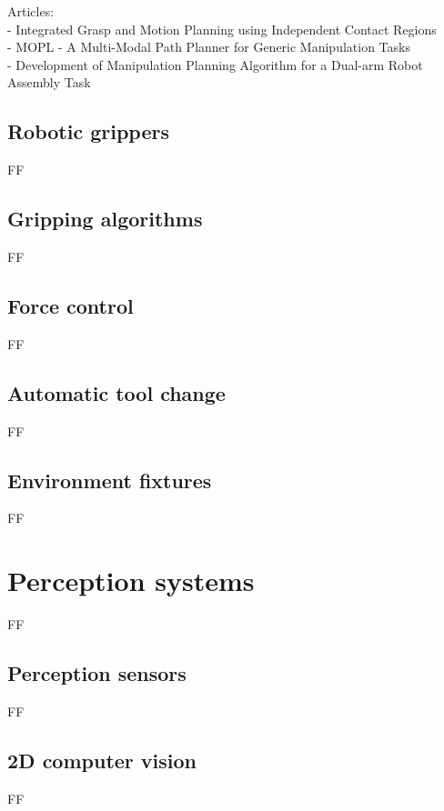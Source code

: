 Articles:\\
- Integrated Grasp and Motion Planning using Independent Contact Regions\\
- MOPL - A Multi-Modal Path Planner for Generic Manipulation Tasks\\
- Development of Manipulation Planning Algorithm for a Dual-arm Robot Assembly Task


\subsection{Robotic grippers}

FF


\subsection{Gripping algorithms}

FF


\subsection{Force control}

FF


\subsection{Automatic tool change}

FF


\subsection{Environment fixtures}

FF


\section{Perception systems}

FF


\subsection{Perception sensors}

FF


\subsection{2D computer vision}

FF


